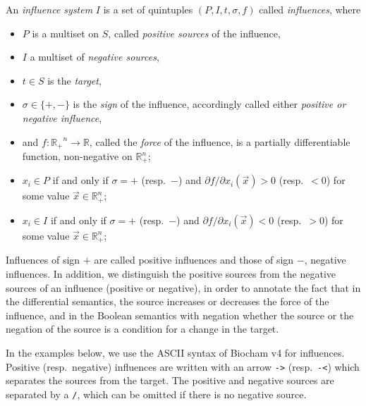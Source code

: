 \documentclass{llncs}
\begin{document}
\begin{definition}\cite{FMRS16cmsb}
An \emph{influence system}
   $I$ is a set of quintuples $(P, I, t, \sigma, f)$ called \emph{influences},
   where 
\begin{itemize}
\item $P$ is a multiset on $S$, called \emph{positive sources} of the influence, 
\item $I$ a multiset of \emph{negative sources}, 
\item $t\in S$ is the \emph{target},
\item $\sigma\in\{+,-\}$ is the \emph{sign} of the influence, accordingly called either \emph{positive or negative influence},
\item and $f:\mathbb{R_+}^n\to\mathbb{R}$, called the \emph{force} of the influence,
is a partially differentiable function, non-negative
   on $\mathbb{R}_+^n$;
\item $x_i\in P$ if and only if $\sigma = +$ (resp.\ $-$) and
   ${\partial {f}}/ {\partial x_i}(\vec x)>0$ (resp.\ $<0$) for some value
   $\vec x\in\mathbb{R}_+^n$;
\item $x_i\in I$ if and only if $\sigma = +$ (resp.\ $-$) and
   ${\partial {f}}/ {\partial x_i}(\vec x)<0$ (resp.\ $>0$) for some value
  $\vec x\in\mathbb{R}_+^n$;
\end{itemize}
\end{definition}

Influences of sign $+$ are called {positive influences} and those of
sign $-$, {negative influences}.
In addition, we distinguish the positive sources from the negative sources of an influence (positive or negative),
in order to annotate the fact that in the differential semantics,
the source increases or decreases the force of the influence,
and in the Boolean semantics with negation whether the source or the negation of the source
is a condition for a change in the target.

In the examples below, we use the ASCII syntax of Biocham v4 for influences.
Positive (resp.~negative) influences are written with an arrow \lstinline|->| (resp.~\lstinline+-<+)
which separates the sources from the target.
The positive and negative sources are separated
by a \lstinline|/|, which can be omitted if there is no negative source.
\end{document}
